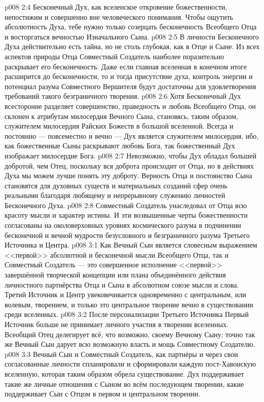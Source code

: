 \vs p008 2:4 \pc Бесконечный Дух, как вселенское откровение божественности, непостижим и совершенно вне человеческого понимания. Чтобы ощутить абсолютность Духа, тебе нужно только созерцать бесконечность Всеобщего Отца и восторгаться вечностью Изначального Сына.
\vs p008 2:5 \pc В личности Бесконечного Духа действительно есть тайна, но не столь глубокая, как в Отце и Сыне. Из всех аспектов природы Отца Совместный Создатель наиболее поразительно раскрывает его бесконечность. Даже если главная вселенная в конечном итоге расширится до бесконечности, то и тогда присутствие духа, контроль энергии и потенциал разума Совместного Вершителя будут достаточны для удовлетворения требований такого безграничного творения.
\vs p008 2:6 Хотя Бесконечный Дух всесторонне разделяет совершенство, праведность и любовь Всеобщего Отца, он склонен к атрибутам милосердия Вечного Сына, становясь, таким образом, служителем милосердия Райских Божеств в большой вселенной. Всегда и постоянно --- повсеместно и вечно --- Дух является служителем милосердия, ибо, как божественные Сыны раскрывают любовь Бога, так божественный Дух изображает милосердие Бога.
\vs p008 2:7 Невозможно, чтобы Дух обладал большей добротой, чем Отец, поскольку вся доброта происходит от Отца, но в действиях Духа мы можем лучше понять эту доброту. Верность Отца и постоянство Сына становятся для духовных существ и материальных созданий сфер очень реальными благодаря любящему и непрерывному служению личностей Бесконечного Духа.
\vs p008 2:8 Совместный Создатель унаследовал от Отца всю красоту мысли и характер истины. И эти возвышенные черты божественности согласованы на околоверховных уровнях космического разума в подчинении бесконечной и вечной мудрости безусловного и безграничного разума Третьего Источника и Центра.
\vs p008 3:1 Как Вечный Сын является словесным выражением <<первой>> абсолютной и бесконечной мысли Всеобщего Отца, так и Совместный Создатель --- это совершенное исполнение <<первой>> завершённой творческой концепции или плана объединённого действия личностного партнёрства Отца и Сына в абсолютном союзе мысли и слова. Третий Источник и Центр увековечивается одновременно с центральным, или волевым, творением, и только это центральное творение вечно в существовании среди вселенных.
\vs p008 3:2 После персонализации Третьего Источника Первый Источник больше не принимает личного участия в творении вселенных. Всеобщий Отец делегирует всё, что возможно, своему Вечному Сыну; точно так же Вечный Сын дарует всю возможную власть и мощь Совместному Создателю.
\vs p008 3:3 Вечный Сын и Совместный Создатель, как партнёры и через свои согласованные личности спланировали и сформировали каждую пост\hyp{}Хавонскую вселенную, которая таким образом обрела существование. Дух поддерживает такие же личные отношения с Сыном во всём последующем творении, какие поддерживает Сын с Отцом в первом и центральном творении.
